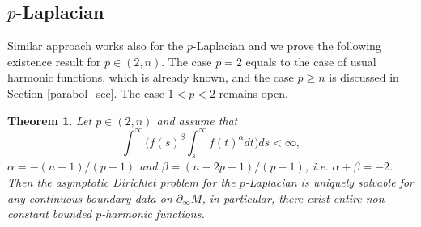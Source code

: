\documentclass[10pt,a4paper,reqno]{amsart}
\newcommand{\pinf}{\partial_{\infty}}
\numberwithin{equation}{section}
\theoremstyle{plain}
\newtheorem{thm}{Theorem}[section]
\theoremstyle{definition}
\begin{document}
\subsection{$p$-Laplacian} 
Similar approach works also for the $p$-Laplacian and we prove the following existence result for $p\in(2,n)$.
The case $p=2$ equals to the case of usual harmonic functions, which is already known, and the case $p\ge n$ 
is discussed in Section \ref{parabol_sec}. The case $1<p<2$ remains open.
\begin{thm}\label{plaplaceexistence}
Let $p\in(2,n)$ and assume that 
	\begin{equation}\label{rotsymplaplaceint}
	\int_1^{\infty}\Big( f(s)^{\beta} \int_s^{\infty} f(t)^{\alpha} dt \Big) ds < \infty,
	\end{equation}
	$\alpha = -(n-1)/(p-1)$ and $\beta = (n-2p+1)/(p-1)$, i.e. $\alpha+\beta =-2$.  
	Then the asymptotic Dirichlet problem for the $p$-Laplacian is uniquely solvable for any 
	continuous boundary data on $\pinf M$, in particular, 	
	there exist entire non-constant bounded $p$-harmonic functions.
\end{thm} 
\end{document}
